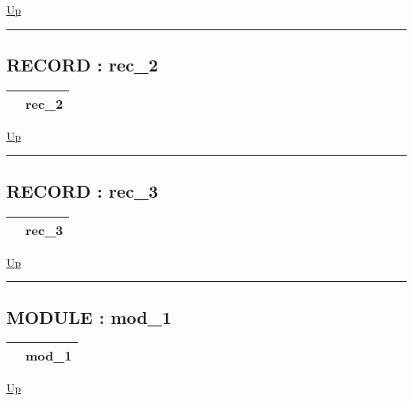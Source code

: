 \hyperlink{ecldoc:example_2}{Up}

\par


\rule{\textwidth}{0.4pt}
\subsection*{RECORD : rec\_2}
\hypertarget{ecldoc:example_2.rec_2}{}

{\renewcommand{\arraystretch}{1.5}
\begin{tabularx}{\textwidth}{|>{\raggedright\arraybackslash}l|X|}
\hline
\hspace{0pt} & rec\_2 \\
\hline
\end{tabularx}
}

\hyperlink{ecldoc:example_2}{Up}

\par


\rule{\textwidth}{0.4pt}
\subsection*{RECORD : rec\_3}
\hypertarget{ecldoc:example_2.rec_3}{}

{\renewcommand{\arraystretch}{1.5}
\begin{tabularx}{\textwidth}{|>{\raggedright\arraybackslash}l|X|}
\hline
\hspace{0pt} & rec\_3 \\
\hline
\end{tabularx}
}

\hyperlink{ecldoc:example_2}{Up}

\par


\rule{\textwidth}{0.4pt}
\subsection*{MODULE : mod\_1}
\hypertarget{ecldoc:example_2.mod_1}{}

{\renewcommand{\arraystretch}{1.5}
\begin{tabularx}{\textwidth}{|>{\raggedright\arraybackslash}l|X|}
\hline
\hspace{0pt} & mod\_1 \\
\hline
\end{tabularx}
}

\hyperlink{ecldoc:example_2}{Up}

\par


